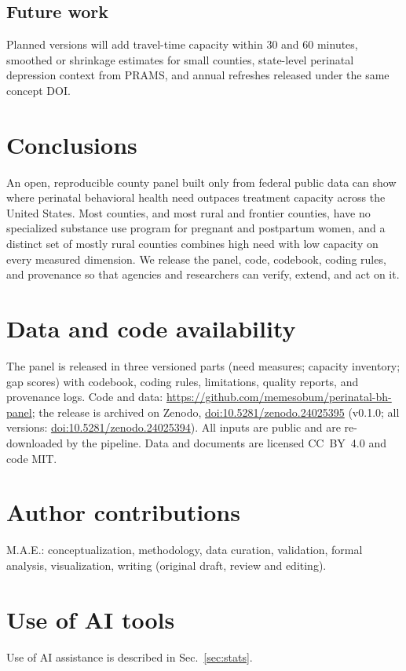 \documentclass[10pt,twocolumn,letterpaper]{article}
\begin{document}
\subsection{Future work}
Planned versions will add travel-time capacity within 30 and 60 minutes, smoothed or shrinkage estimates for small counties, state-level perinatal depression context from PRAMS, and annual refreshes released under the same concept DOI.

\section{Conclusions}
An open, reproducible county panel built only from federal public data can show where perinatal behavioral health need outpaces treatment capacity across the United States. Most counties, and most rural and frontier counties, have no specialized substance use program for pregnant and postpartum women, and a distinct set of mostly rural counties combines high need with low capacity on every measured dimension. We release the panel, code, codebook, coding rules, and provenance so that agencies and researchers can verify, extend, and act on it.

\section*{Data and code availability}
\noindent The panel is released in three versioned parts (need measures; capacity inventory; gap scores) with codebook, coding rules, limitations, quality reports, and provenance logs. Code and data: \url{https://github.com/memesobum/perinatal-bh-panel}; the release is archived on Zenodo, \href{https://doi.org/10.5281/zenodo.24025395}{doi:10.5281/zenodo.24025395} (v0.1.0; all versions: \href{https://doi.org/10.5281/zenodo.24025394}{doi:10.5281/zenodo.24025394}). All inputs are public and are re-downloaded by the pipeline. Data and documents are licensed CC~BY~4.0 and code MIT.

\section*{Author contributions}
\noindent M.A.E.: conceptualization, methodology, data curation, validation, formal analysis, visualization, writing (original draft, review and editing).

\section*{Use of AI tools}
\noindent Use of AI assistance is described in Sec.~\ref{sec:stats}.
\end{document}
